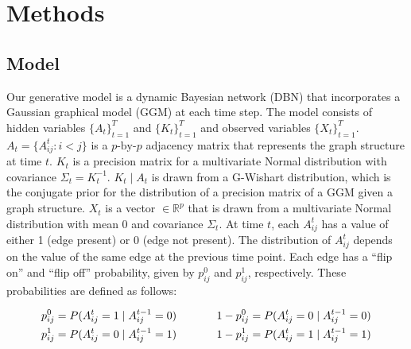 \documentclass{article}
\begin{document}
\section{Methods}
\label{sec:methods}


\subsection{Model}
\label{sec:model}
Our generative model is a dynamic Bayesian network (DBN) that incorporates a Gaussian graphical model (GGM) at each time step. The model consists of hidden variables $\{A_t\}_{t=1}^T$ and $\{K_t\}_{t=1}^T$ and observed variables $\{X_t\}_{t=1}^T$. $A_t = \{ A_{ij}^t : i < j \}$ is a $p\text{-by-}p$ adjacency matrix that represents the graph structure at time $t$. $K_t$ is a precision matrix for a multivariate Normal distribution with covariance $\Sigma_t = K_t^{-1}$. $K_t \mid A_t$ is drawn from a G-Wishart distribution, which is the conjugate prior for the distribution of a precision matrix of a GGM given a graph structure. $X_t$ is a vector $\in \mathbb{R}^p$ that is drawn from a multivariate Normal distribution with mean $0$ and covariance $\Sigma_t$. At time $t$, each $A_{ij}^t$ has a value of either 1 (edge present) or 0 (edge not present). The distribution of $A_{ij}^t$ depends on the value of the same edge at the previous time point. Each edge has a ``flip on'' and ``flip off'' probability, given by $p_{ij}^0$ and $p_{ij}^1$, respectively. These probabilities are defined as follows: 

\begin{align*}
p_{ij}^0 = P(A_{ij}^t = 1 \mid A_{ij}^{t-1} = 0) \hspace{.5in} 1 - p_{ij}^0 = P(A_{ij}^t = 0 \mid A_{ij}^{t-1} = 0) \\
p_{ij}^1 = P(A_{ij}^t = 0 \mid A_{ij}^{t-1} = 1) \hspace{.5in} 1 - p_{ij}^1 = P(A_{ij}^t = 1 \mid A_{ij}^{t-1} = 1)
\end{align*}
\end{document}
